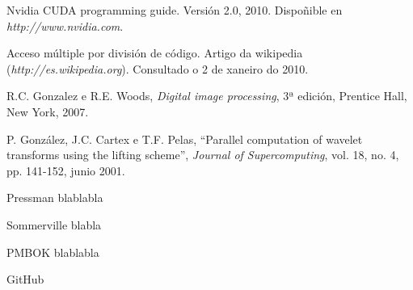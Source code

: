 

\begin{thebibliography}{99}
 Nvidia CUDA programming guide. Versión 2.0, 2010. Dispoñible en {\it http://www.nvidia.com}.

 Acceso múltiple por división de código. Artigo da wikipedia ({\it http://es.wikipedia.org}). Consultado o 2 de xaneiro do 2010.

 R.C. Gonzalez e R.E. Woods, {\it Digital image processing}, 3ª edición, Prentice Hall, New York, 2007.

 P. González, J.C. Cartex e T.F. Pelas, ``Parallel computation of wavelet transforms using the lifting scheme'', {\it Journal of Supercomputing}, vol. 18, no. 4, pp. 141-152, junio 2001.

 Pressman blablabla

 Sommerville blabla

 PMBOK blablabla

 GitHub  

\end{thebibliography}

